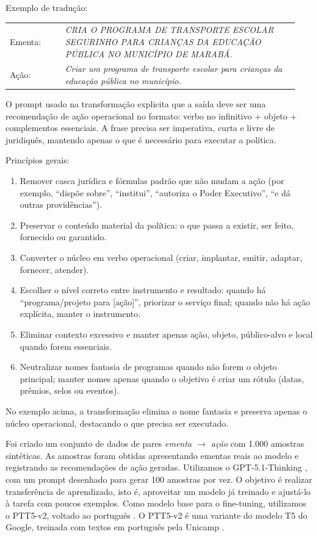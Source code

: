 \documentclass[10pt,a4paper]{article}
\begin{document}
Exemplo de tradução:
\begin{table}[H]
\centering
\small
\begin{tabular}{p{0.18\linewidth} p{0.76\linewidth}}
Ementa: & \textit{CRIA O PROGRAMA DE TRANSPORTE ESCOLAR SEGURINHO PARA CRIANÇAS DA EDUCAÇÃO PÚBLICA NO MUNICÍPIO DE MARABÁ.} \\
\addlinespace[4pt]
Ação: & \textit{Criar um programa de transporte escolar para crianças da educação pública no município.} \\
\end{tabular}
\end{table}

O prompt usado na transformação explicita que a saída deve ser uma recomendação de ação operacional no formato: verbo no infinitivo + objeto + complementos essenciais. A frase precisa ser imperativa, curta e livre de juridiquês, mantendo apenas o que é necessário para executar a política.

Princípios gerais:
\begin{enumerate}[leftmargin=*]
  \item Remover casca jurídica e fórmulas padrão que não mudam a ação (por exemplo, ``dispõe sobre'', ``institui'', ``autoriza o Poder Executivo'', ``e dá outras providências'').
  \item Preservar o conteúdo material da política: o que passa a existir, ser feito, fornecido ou garantido.
  \item Converter o núcleo em verbo operacional (criar, implantar, emitir, adaptar, fornecer, atender).
  \item Escolher o nível correto entre instrumento e resultado: quando há ``programa/projeto para [ação]'', priorizar o serviço final; quando não há ação explícita, manter o instrumento.
  \item Eliminar contexto excessivo e manter apenas ação, objeto, público-alvo e local quando forem essenciais.
  \item Neutralizar nomes fantasia de programas quando não forem o objeto principal; manter nomes apenas quando o objetivo é criar um rótulo (datas, prêmios, selos ou eventos).
\end{enumerate}

No exemplo acima, a transformação elimina o nome fantasia e preserva apenas o núcleo operacional, destacando o que precisa ser executado.

Foi criado um conjunto de dados de pares \textit{ementa $\rightarrow$ ação} com 1.000 amostras sintéticas. As amostras foram obtidas apresentando ementas reais ao modelo e registrando as recomendações de ação geradas. Utilizamos o GPT-5.1-Thinking \cite{openai_gpt51_model,openai_gpt51_system_card}, com um prompt desenhado para gerar 100 amostras por vez. O objetivo é realizar transferência de aprendizado, isto é, aproveitar um modelo já treinado e ajustá-lo à tarefa com poucos exemplos. Como modelo base para o fine-tuning, utilizamos o PTT5-v2, voltado ao português \cite{piau_ptt5v2_2024}. O PTT5-v2 é uma variante do modelo T5 do Google, treinada com textos em português pela Unicamp \cite{raffel_t5_2020}.
\end{document}
